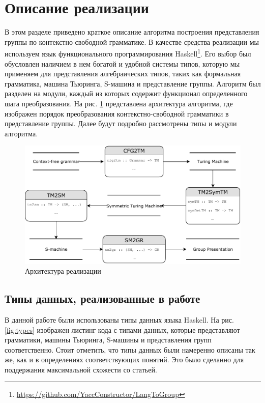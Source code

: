 \documentclass[14pt]{matmex-diploma-custom}
\begin{document}
\section{Описание реализации}

В этом разделе приведено краткое описание алгоритма построения представления
группы по контекстно-свободной грамматике. 
В качестве средства реализации мы используем язык функционального 
программирования Haskell\footnote{\url{https://github.com/YaccConstructor/LangToGroup}}.
Его выбор был обусловлен наличием в нем богатой и удобной системы типов,
которую мы применяем для представления алгебраических типов, таких как формальная грамматика,
машина Тьюринга, S-машина и представление группы. 
Алгоритм был разделен на модули, каждый из которых
содержит функционал определенного шага преобразования. 
На рис. \ref{fig:arch} представлена архитектура алгоритма,
где изображен порядок преобразования контекстно-свободной грамматики 
в представление группы. Далее будут подробно рассмотрены типы и модули алгоритма.

\begin{figure}[H]
\centering
  \includegraphics[width=\linewidth]{pics/diplomaSmallUML.pdf}
  \caption{Архитектура реализации}
  \label{fig:arch}
\end{figure}

\subsection{Типы данных, реализованные в работе}
В данной работе были использованы типы данных языка Haskell. На рис. \ref{fig:types} изображен листинг кода с типами данных, которые представляют грамматики, машины Тьюринга, S-машины и представления групп соответственно. Стоит отметить, что типы данных были намеренно описаны так же, как и в определениях соответствующих понятий. Это было сделанно для поддержания максимальной схожести со статьей. 
\end{document}
